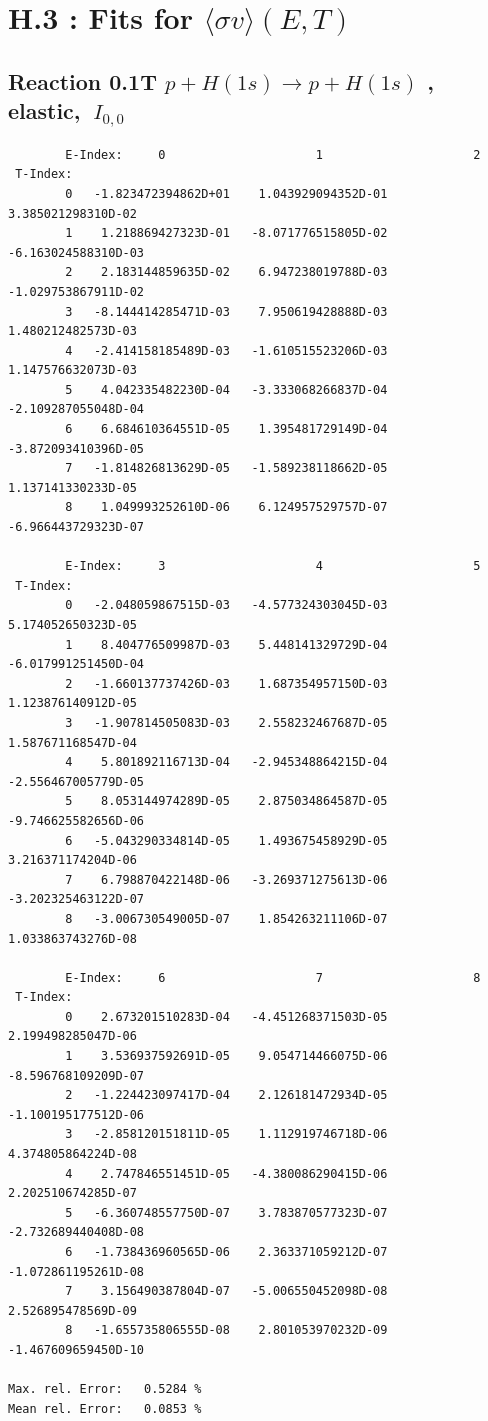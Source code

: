 \documentclass[12pt,dvipdfmx]{article}
\begin{document}
\section{H.3 : Fits for $\langle\sigma v \rangle (E,T)$}\label{sect3}


\subsection{
Reaction 0.1T  $p + H(1s) \rightarrow  p + H(1s)$
, elastic,
$\  I_{0,0}$
}




\begin{small}\begin{verbatim}
        E-Index:     0                     1                     2
 T-Index:
        0   -1.823472394862D+01    1.043929094352D-01    3.385021298310D-02
        1    1.218869427323D-01   -8.071776515805D-02   -6.163024588310D-03
        2    2.183144859635D-02    6.947238019788D-03   -1.029753867911D-02
        3   -8.144414285471D-03    7.950619428888D-03    1.480212482573D-03
        4   -2.414158185489D-03   -1.610515523206D-03    1.147576632073D-03
        5    4.042335482230D-04   -3.333068266837D-04   -2.109287055048D-04
        6    6.684610364551D-05    1.395481729149D-04   -3.872093410396D-05
        7   -1.814826813629D-05   -1.589238118662D-05    1.137141330233D-05
        8    1.049993252610D-06    6.124957529757D-07   -6.966443729323D-07

        E-Index:     3                     4                     5
 T-Index:
        0   -2.048059867515D-03   -4.577324303045D-03    5.174052650323D-05
        1    8.404776509987D-03    5.448141329729D-04   -6.017991251450D-04
        2   -1.660137737426D-03    1.687354957150D-03    1.123876140912D-05
        3   -1.907814505083D-03    2.558232467687D-05    1.587671168547D-04
        4    5.801892116713D-04   -2.945348864215D-04   -2.556467005779D-05
        5    8.053144974289D-05    2.875034864587D-05   -9.746625582656D-06
        6   -5.043290334814D-05    1.493675458929D-05    3.216371174204D-06
        7    6.798870422148D-06   -3.269371275613D-06   -3.202325463122D-07
        8   -3.006730549005D-07    1.854263211106D-07    1.033863743276D-08

        E-Index:     6                     7                     8
 T-Index:
        0    2.673201510283D-04   -4.451268371503D-05    2.199498285047D-06
        1    3.536937592691D-05    9.054714466075D-06   -8.596768109209D-07
        2   -1.224423097417D-04    2.126181472934D-05   -1.100195177512D-06
        3   -2.858120151811D-05    1.112919746718D-06    4.374805864224D-08
        4    2.747846551451D-05   -4.380086290415D-06    2.202510674285D-07
        5   -6.360748557750D-07    3.783870577323D-07   -2.732689440408D-08
        6   -1.738436960565D-06    2.363371059212D-07   -1.072861195261D-08
        7    3.156490387804D-07   -5.006550452098D-08    2.526895478569D-09
        8   -1.655735806555D-08    2.801053970232D-09   -1.467609659450D-10

Max. rel. Error:   0.5284 %
Mean rel. Error:   0.0853 %
\end{verbatim}\end{small}
\end{document}
